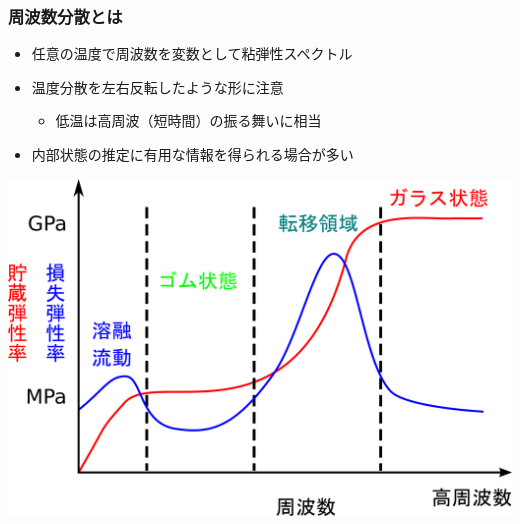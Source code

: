 \documentclass[unicode,12pt]{beamer}%
\begin{document}
\begin{frame}
    \frametitle{周波数分散とは}
		\begin{itemize}
			\item \alert{任意の温度で周波数を変数}として粘弾性スペクトル
			\item \alert{温度分散を左右反転したような形に注意}
					\begin{itemize}
                        \item 低温は高周波（短時間）の振る舞いに相当
                    \end{itemize}
			\item 内部状態の推定に有用な情報を得られる場合が多い
		\end{itemize}

		\vspace{2mm}
		\centering
		\includegraphics[width=.7\textwidth]{dynamic_ViscoElast_Freq.png}
\end{frame}
\end{document}
